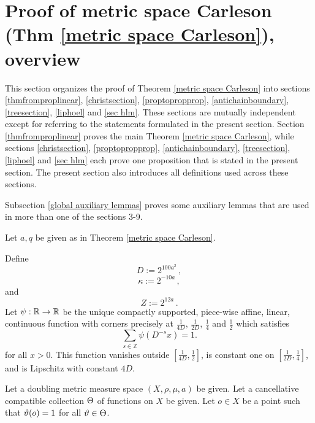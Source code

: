 \section{Proof of metric space Carleson (Thm \ref{metric space Carleson}), overview}
\label{overviewsection}


This section organizes the proof of Theorem
\ref{metric space Carleson} into sections \ref{thmfromproplinear}, \ref{christsection}, \ref{proptopropprop}, \ref{antichainboundary}, \ref{treesection}, \ref{liphoel} and \ref{sec hlm}. These sections are mutually independent except for referring to
the statements formulated in the present section.
Section \ref{thmfromproplinear} proves the main Theorem \ref{metric space Carleson}, while sections
\ref{christsection}, \ref{proptopropprop}, \ref{antichainboundary}, \ref{treesection}, \ref{liphoel} and \ref{sec hlm} each prove one proposition that is stated in the present section.
The present section  also introduces all definitions used across these sections.

Subsection \ref{global auxiliary lemmas} proves some auxiliary lemmas that are used in more than one
of the sections 3-9.

Let $a, q$ be given as in Theorem \ref{metric space Carleson}.




Define
\begin{equation}\label{defineD}
D:= 2^{100 a^2}\,  ,
\end{equation}
\begin{equation}\label{definekappa}
\kappa:= 2^{-10a}\,,
\end{equation}
and
\begin{equation}
    \label{defineZ}
    Z := 2^{12a}\,.
\end{equation}
Let
 $\psi:\mathbb{R} \to \mathbb{R}$ be the unique compactly supported, piece-wise affine, linear, continuous function with corners precisely at $\frac 1{4D}$, $\frac 1{2D}$, $\frac 14$ and $\frac 12$ which satisfies
 \begin{equation}
    \label{eq psisum}
    \sum_{s\in \mathbb{Z}} \psi(D^{-s}x)=1 .
\end{equation}
for all  $x>0$. This function vanishes outside $[\frac1{4D},\frac 12]$, is constant one on
$[\frac1{2D},\frac 14]$, and is Lipschitz
with constant $4D$.







Let a doubling metric measure space $(X,\rho,\mu, a)$ be given.
Let a cancellative compatible collection $\Theta$ of functions on $X$ be given.
Let $o\in X$ be a point such that $\vartheta(o)=1$
for all $\vartheta\in \Theta$.


